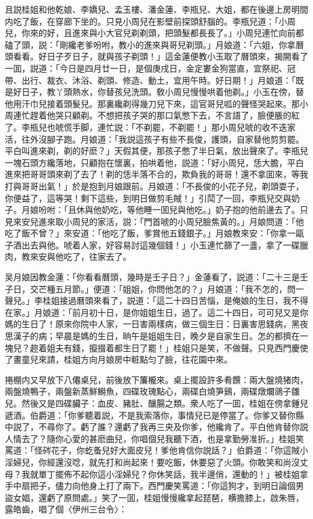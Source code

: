 且説桂姐和他乾娘、李嬌兒、孟玉樓、潘金蓮、李瓶兒、大姐，都在後邊上房明間内吃了飯，在穿廊下坐的。只見小周兒在影壁前探頭舒腦的。李瓶兒道：「小周兒，你來的好，且進來與小大官兒剃剃頭，把頭髮都長長了。」小周兒連忙向前都磕了頭，説：「剛纔老爹吩咐，教小的進來與哥兒剃頭。」月娘道：「六姐，你拿曆頭看看。好日子歹日子，就與孩子剃頭！」這金蓮便教小玉取了曆頭來，揭開看了一囬，説道：「今日是四月廿一日，是個庚戌日，金定婁金狗當直，宜祭祀、冠帶、出行、裁衣、沐浴、剃頭、修造、動土，宜用午時。好日期！」月娘道：「既是好日子，教丫頭熱水，你替孩兒洗頭。敎小周兒慢慢哄着他剃。」小玉在傍，替他用汗巾兒接着頭髮兒。那裏纔剃得幾刀兒下來，這官哥兒呱的聲怪哭起來。那小周連忙趕着他哭只顧剃。不想把孩子哭的那口氣憋下去，不言語了，臉便脹的紅了。李瓶兒也唬慌手脚，連忙説：「不剃罷，不剃罷！」那小周兒唬的收不迭家活，往外沒腳子跑。月娘道：「我説這孩子有些不長俊，護頭，自家替他剪剪罷。平白叫進來剃，剃的好麽？」天假其便，那孩子憋了半日氣，放出聲來了。李瓶兒一塊石頭方纔落地，只顧抱在懷裏，拍哄着他，説道：「好小周兒，恁大膽，平白進來把哥哥頭來剃了去了！剃的恁半落不合的，欺負我的哥哥！還不拿囬來，等我打與哥哥出氣！」於是抱到月娘跟前。月娘道：「不長俊的小花子兒，剃頭耍子，你便益了，這等哭！剩下這些，到明日做剪毛賊！」引鬦了一回，李瓶兒交與奶子。月娘吩咐：「且休與他奶吃，等他睡一囬兒與他吃。」奶子抱的他前邊去了。只見來安兒進來取小周兒的家活，説：「門首唬的小周兒臉焦黃的。」月娘問道：「他吃了飯不曾？」來安道：「他吃了飯，爹賞他五錢銀子。」月娘教來安：「你拿一甌子酒出去與他。唬着人家，好容易討這幾個錢！」小玉連忙篩了一盞，拿了一碟臘肉，教來安與他吃了，往家去了。

吴月娘因教金蓮：「你看看曆頭，幾時是壬子日？」金蓮看了，説道：「二十三是壬子日，交芒種五月節。」便道：「姐姐，你問他怎的？」月娘道：「我不怎的，問一聲兒。」李桂姐接過曆頭來看了，説道：「這二十四日苦惱，是俺娘的生日，我不得在家。」月娘道：「前月初十日，是你姐姐生日，過了。這二十四日，可可兒又是你媽的生日了！原來你院中人家，一日害兩樣病，做三個生日：日裏害思錢病，黑夜思漢子的病；早晨是媽的生日，晌午是姐姐生日，晚夕是自家生日。怎的都擠在一塊兒？趂着姐夫有錢，攛掇着都生日了罷！」桂姐只是笑，不做聲。只見西門慶使了畫童兒來請，桂姐方向月娘房中粧點匀了臉，往花園中來。

捲棚内又早放下八僊桌兒，前後放下簾櫳來。桌上擺設許多肴饌：兩大盤燒猪肉，兩盤燒鴨子，兩盤新蒸鮮鰣魚，四碟玫瑰點心，兩碟白燒笋鷄，兩碟燉爛鴿子雛兒。然後又是四碟臟子：血皮、豬肚、釀腸之類。衆人吃了一囬，桂姐在傍拿鍾兒遞酒。伯爵道：「你爹聽着説，不是我索落你，事情兒已是停當了。你爹又替你縣中説了，不尋你了。虧了誰？還虧了我再三央及你爹，他纔肯了。平白他肯替你説人情去了？隨你心愛的甚麽曲兒，你唱個兒我聽下酒，也是拿勤勞准折。」桂姐笑罵道：「怪硶花子，你虼蚤兒好大面皮兒！爹他肯信你説話？」伯爵道：「你這賊小淫婦兒，你經還沒唸，就先打和尚起來！要吃飯，休要惡了火頭。你敢笑和尚沒丈母？我就單丁擺佈不起你這小淫婦兒？你休笑話，我半邊俏，還動的！」被桂姐拿手中扇把子，儘力向他身上打了兩下。西門慶笑罵道：「你這狗才，到明日論個男盜女娼，還虧了原問處。」笑了一囬，桂姐慢慢纔拿起琵琶，横擔膝上，啟朱唇，露皓齒，唱了個〈伊州三台令〉：

